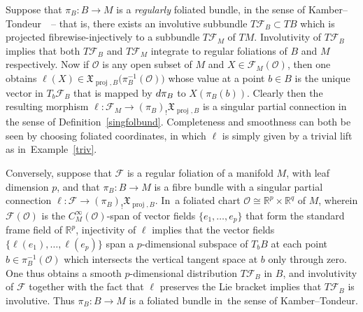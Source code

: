 \documentclass[11pt]{article}
\numberwithin{equation}{section}
\numberwithin{equation}{section}
\def\proj{\operatorname{proj}}
\def\FF{{\mathcal{F}}}
\def\OO{{\mathcal{O}}}
\def\RB{{\mathbb{R}}}
\def\XF{{\mathfrak{X}}}
\begin{document}
\begin{Example}\label{regex}
Suppose that $\pi_{B}\colon B\rightarrow M$ is a \textit{regularly} foliated bundle, in the sense of Kamber--Tondeur~\cite[Definition~2.1]{folbund}~-- that is, there exists an involutive subbundle $T\FF_{B}\subset TB$ which is projected fibrewise-injectively to a subbundle $T\FF_{M}$ of $TM$. Involutivity of $T\FF_{B}$ implies that both $T\FF_{B}$ and $T\FF_{M}$ integrate to regular foliations of $B$ and $M$ respectively. Now if $\OO$ is any open subset of $M$ and $X\in\FF_{M}(\OO)$, then one obtains $\ell(X)\in\XF_{\proj,B}\big(\pi_{B}^{-1}(\OO)\big)$ whose value at a point $b\in B$ is the unique vector in $T_{b}\FF_{B}$ that is mapped by ${\rm d}\pi_{B}$ to $X(\pi_{B}(b))$. Clearly then the resulting morphism $\ell\colon \FF_{M}\rightarrow(\pi_{B})_{!}\XF_{\proj,B}$ is a singular partial connection in the sense of Definition~\ref{singfolbund}. Completeness and smoothness can both be seen by choosing foliated coordinates, in which $\ell$ is simply given by a trivial lift as in~Example~\ref{triv}.

Conversely, suppose that $\FF$ is a regular foliation of a manifold $M$, with leaf dimension $p$, and that $\pi_{B}\colon B\rightarrow M$ is a fibre bundle with a singular partial connection $\ell\colon \FF\rightarrow(\pi_{B})_{!}\XF_{\proj,B}$. In~a foliated chart $\OO\cong\RB^{p}\times\RB^{q}$ of $M$, wherein $\FF(\OO)$ is the $C^{\infty}_{M}(\OO)$-span of vector fields $\{e_{1},\dots,e_{p}\}$ that form the standard frame field of $\RB^{p}$, injectivity of $\ell$ implies that the vector fields $\{\ell(e_{1}),\dots,\ell(e_{p})\}$ span a $p$-dimensional subspace of $T_{b}B$ at each point $b\in\pi_{B}^{-1}(\OO)$ which intersects the vertical tangent space at $b$ only through zero. One thus obtains a smooth $p$-dimensional distribution $T\FF_{B}$ in $B$, and involutivity of $\FF$ together with the fact that $\ell$ preserves the Lie bracket implies that $T\FF_{B}$ is involutive. Thus $\pi_{B}\colon B\rightarrow M$ is a foliated bundle in~the sense of Kamber--Tondeur.
\end{Example}
\end{document}
